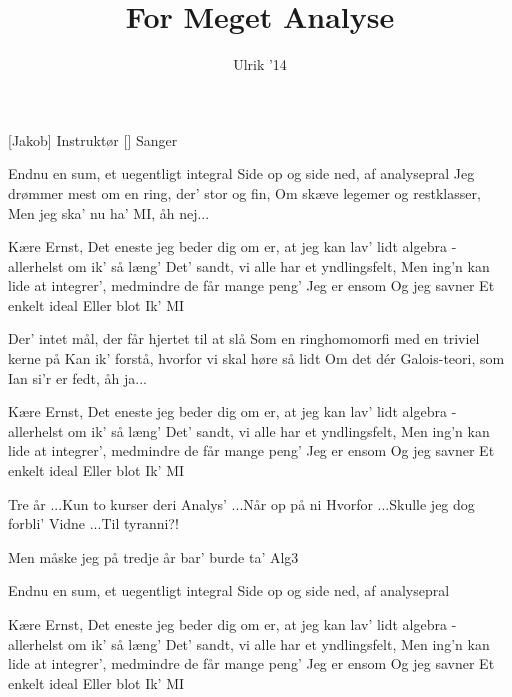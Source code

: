 \documentclass[a4paper,11pt]{article}
\title{For Meget Analyse}
\author{Ulrik '14}
\begin{document}
\maketitle

\begin{roles}
[Jakob] Instruktør
[] Sanger
\end{roles}

\begin{song}
 Endnu en sum, et uegentligt integral
Side op og side ned, af analysepral
Jeg drømmer mest om en ring, der' stor og fin,
Om skæve legemer og restklasser,
Men jeg ska' nu ha' MI, åh nej...

 Kære Ernst,
Det eneste jeg beder dig om
er, at jeg kan lav' lidt algebra
- allerhelst om ik' så læng'
Det' sandt, vi alle har et yndlingsfelt,
Men ing'n kan lide at integrer', medmindre
de får mange peng'
Jeg er ensom
Og jeg savner
Et enkelt ideal
Eller blot
Ik' MI

 Der' intet mål, der får hjertet til at slå
Som en ringhomomorfi med en triviel kerne på
Kan ik' forstå, hvorfor vi skal høre så lidt
Om det dér Galois-teori, som Ian si'r er fedt, åh ja...

 Kære Ernst,
Det eneste jeg beder dig om
er, at jeg kan lav' lidt algebra
- allerhelst om ik' så læng'
Det' sandt, vi alle har et yndlingsfelt,
Men ing'n kan lide at integrer', medmindre
de får mange peng'
Jeg er ensom
Og jeg savner
Et enkelt ideal
Eller blot
Ik' MI

 Tre år
 ...Kun to kurser deri
 Analys'
 ...Når op på ni
 Hvorfor
 ...Skulle jeg dog forbli'
 Vidne
 ...Til tyranni?!

 Men måske jeg på tredje år
bar' burde ta' Alg3 

 Endnu en sum, et uegentligt integral
Side op og side ned, af analysepral

 Kære Ernst,
Det eneste jeg beder dig om
er, at jeg kan lav' lidt algebra
- allerhelst om ik' så læng'
Det' sandt, vi alle har et yndlingsfelt,
Men ing'n kan lide at integrer', medmindre
de får mange peng'
Jeg er ensom
Og jeg savner
Et enkelt ideal
Eller blot
Ik' MI




\end{song}
\end{document}
